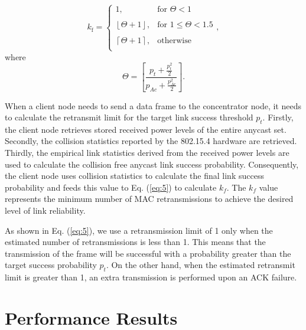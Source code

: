 \documentclass[conference]{IEEEtran}
\begin{document}
\begin{equation}
\label{eq:5}
    k_{\textrm{f}} = \left\{
    \begin{array}{ll}
        1, &\mbox{for } \Theta < 1\\ \\
        \left\lfloor\Theta + 1 \right\rfloor, &\mbox{for } 1 \leq \Theta < 1.5\\ \\
        \left\lceil\Theta + 1 \right\rceil, &\mbox{otherwise} \\
    \end{array} \right.,
\end{equation}where
\begin{equation}
\Theta = \left[\frac{p_t+\frac{p_t^2}{2}}{p_{Ac}+\frac{p_{Ac}^2}{2}}\right].
\end{equation}

When a client node needs to send a data frame to the concentrator
node, it needs to calculate the retransmit limit for the target link
success threshold $p_t$. Firstly, the client node retrieves stored
received power levels of the entire anycast set. Secondly, the collision statistics reported by the 802.15.4 hardware are retrieved. Thirdly, the empirical link statistics derived from the received power levels are used to calculate the collision free anycast link success probability. Consequently, the client node uses collision statistics to calculate the final link success probability and feeds this value to Eq. (\ref{eq:5}) to calculate $k_f$. The $k_f$ value represents the minimum number of MAC retransmissions to achieve the desired level of link reliability.

As shown in Eq. (\ref{eq:5}), we use a retransmission limit of 1
only when the estimated number of retransmissions is less than 1.
This means that the transmission of the frame will be successful
with a probability greater than the target success probability
$p_t$. On the other hand, when the estimated retransmit limit is
greater than 1, an extra transmission is performed upon an ACK failure.


\section{Performance Results}\label{evaluation}
\end{document}
